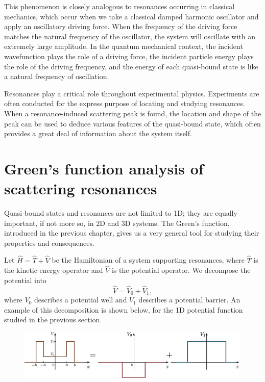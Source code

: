 \documentclass[pra,12pt]{revtex4}
\begin{document}
This phenomenon is closely analogous to resonances occurring in
classical mechanics, which occur when we take a classical damped
harmonic oscillator and apply an oscillatory driving force.  When the
frequency of the driving force matches the natural frequency of the
oscillator, the system will oscillate with an extremely large
amplitude.  In the quantum mechanical context, the incident
wavefunction plays the role of a driving force, the incident particle
energy plays the role of the driving frequency, and the energy of each
quasi-bound state is like a natural frequency of oscillation.

Resonances play a critical role throughout experimental physics.
Experiments are often conducted for the express purpose of locating
and studying resonances.  When a resonance-induced scattering peak is
found, the location and shape of the peak can be used to deduce
various features of the quasi-bound state, which often provides a
great deal of information about the system itself.

\section{Green's function analysis of scattering resonances}

Quasi-bound states and resonances are not limited to 1D; they are
equally important, if not more so, in 2D and 3D systems.  The Green's
function, introduced in the previous chapter, gives us a very general
tool for studying their properties and consequences.

Let $\hat{H} = \hat{T} + \hat{V}$ be the Hamiltonian of a system
supporting resonances, where $\hat{T}$ is the kinetic energy operator
and $\hat{V}$ is the potential operator.  We decompose the potential
into
$$\hat{V} = \hat{V}_0 + \hat{V}_1,$$
where $V_0$ describes a potential well and $V_1$ describes a potential
barrier.  An example of this decomposition is shown below, for the
1D potential function studied in the previous section.

\begin{figure}[h]
  \centering\includegraphics[width=0.99\textwidth]{resonancewell_decomp}
\end{figure}
\end{document}
